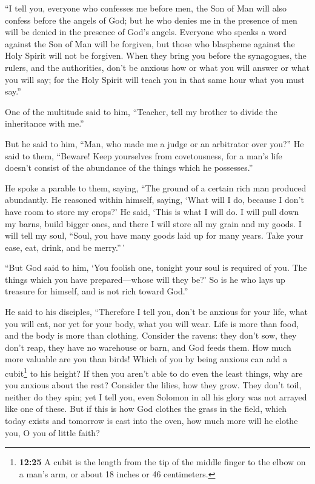  ``I tell you, everyone who confesses me before men, the
Son of Man will also confess before the angels of God; 
but he who denies me in the presence of men will be denied in the
presence of God's angels.  Everyone who speaks a word
against the Son of Man will be forgiven, but those who blaspheme against
the Holy Spirit will not be forgiven.  When they bring
you before the synagogues, the rulers, and the authorities, don't be
anxious how or what you will answer or what you will say;
 for the Holy Spirit will teach you in that same hour
what you must say.''

 One of the multitude said to him, ``Teacher, tell my
brother to divide the inheritance with me.''

 But he said to him, ``Man, who made me a judge or an
arbitrator over you?''  He said to them, ``Beware! Keep
yourselves from covetousness, for a man's life doesn't consist of the
abundance of the things which he possesses.''

 He spoke a parable to them, saying, ``The ground of a
certain rich man produced abundantly.  He reasoned within
himself, saying, `What will I do, because I don't have room to store my
crops?'  He said, `This is what I will do. I will pull
down my barns, build bigger ones, and there I will store all my grain
and my goods.  I will tell my soul, ``Soul, you have many
goods laid up for many years. Take your ease, eat, drink, and be
merry.''\,'

 ``But God said to him, `You foolish one, tonight your
soul is required of you. The things which you have prepared---whose will
they be?'  So is he who lays up treasure for himself, and
is not rich toward God.''

 He said to his disciples, ``Therefore I tell you, don't
be anxious for your life, what you will eat, nor yet for your body, what
you will wear.  Life is more than food, and the body is
more than clothing.  Consider the ravens: they don't sow,
they don't reap, they have no warehouse or barn, and God feeds them. How
much more valuable are you than birds!  Which of you by
being anxious can add a cubit\footnote{\textbf{12:25} A cubit is the
  length from the tip of the middle finger to the elbow on a man's arm,
  or about 18 inches or 46 centimeters.} to his height? 
If then you aren't able to do even the least things, why are you anxious
about the rest?  Consider the lilies, how they grow. They
don't toil, neither do they spin; yet I tell you, even Solomon in all
his glory was not arrayed like one of these.  But if this
is how God clothes the grass in the field, which today exists and
tomorrow is cast into the oven, how much more will he clothe you, O you
of little faith?

